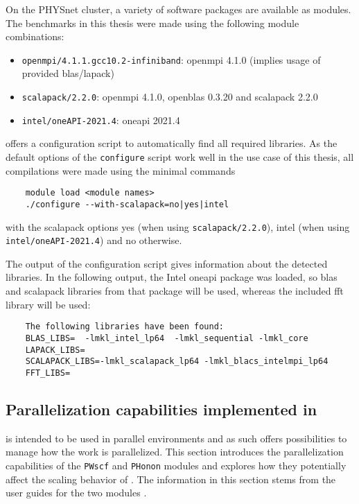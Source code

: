 \documentclass[main.tex]{subfiles}
\begin{document}
On the PHYSnet cluster, a variety of software packages are available as modules.
The benchmarks in this thesis were made using the following module combinations:
\begin{itemize}
    \item \texttt{openmpi/4.1.1.gcc10.2-infiniband}: \gls{openmpi} 4.1.0 (implies usage of \QE provided \gls{blas}/\gls{lapack})
    \item \texttt{scalapack/2.2.0}: \gls{openmpi} 4.1.0, \gls{openblas} 0.3.20 and \gls{scalapack} 2.2.0
    \item \texttt{intel/oneAPI-2021.4}: \gls{oneapi} 2021.4
\end{itemize}

\QE offers a configuration script to automatically find all required libraries.
As the default options of the \texttt{configure} script work well in the use case of this thesis, all compilations were made using the minimal commands
\begin{verbatim}
    module load <module names>
    ./configure --with-scalapack=no|yes|intel
\end{verbatim}
with the scalapack options yes (when using \texttt{scalapack/2.2.0}), intel (when using \\ \texttt{intel/oneAPI-2021.4}) and no otherwise.

The output of the configuration script gives information about the detected libraries.
In the following output, the Intel \gls{oneapi} package was loaded, so \gls{blas} and \gls{scalapack} libraries from that package will be used, whereas the included \gls{fft} library will be used:
\begin{verbatim}
    The following libraries have been found:
    BLAS_LIBS=  -lmkl_intel_lp64  -lmkl_sequential -lmkl_core
    LAPACK_LIBS=
    SCALAPACK_LIBS=-lmkl_scalapack_lp64 -lmkl_blacs_intelmpi_lp64
    FFT_LIBS= 
\end{verbatim}

\subsection{Parallelization capabilities implemented in \QE}\label{sub:qe_parallelization}

\QE is intended to be used in parallel environments and as such offers possibilities to manage how the work is parallelized.
This section introduces the parallelization capabilities of the \texttt{PWscf} and \texttt{PHonon} modules and explores how they potentially affect the scaling behavior of \QE. The information in this section stems from the user guides for the two modules \cite{noauthor_pwscf_nodate, noauthor_phonon_nodate}.
\end{document}
